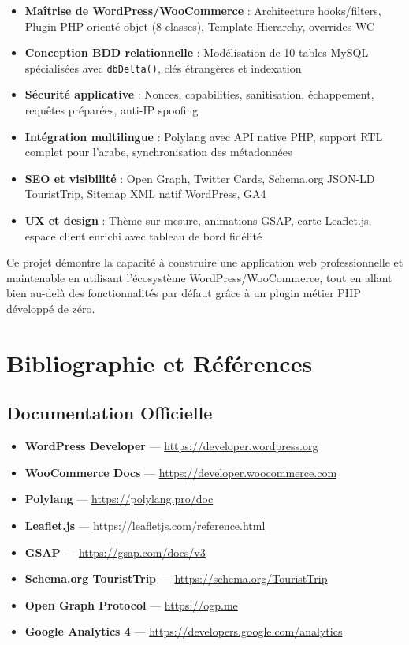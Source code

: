\documentclass[12pt,a4paper]{report}
\begin{document}
\begin{itemize}
  \item \textbf{Ma\^itrise de WordPress/WooCommerce} : Architecture hooks/filters,
        Plugin PHP orient\'e objet (8 classes), Template Hierarchy, overrides WC
  \item \textbf{Conception BDD relationnelle} : Mod\'elisation de 10 tables MySQL
        sp\'ecialis\'ees avec \texttt{dbDelta()}, cl\'es \'etrang\`eres et
        indexation
  \item \textbf{S\'ecurit\'e applicative} : Nonces, capabilities, sanitisation,
        \'echappement, requ\^etes pr\'epar\'ees, anti-IP spoofing
  \item \textbf{Int\'egration multilingue} : Polylang avec API native PHP, support
        RTL complet pour l'arabe, synchronisation des m\'etadonn\'ees
  \item \textbf{SEO et visibilit\'e} : Open Graph, Twitter Cards, Schema.org
        JSON-LD TouristTrip, Sitemap XML natif WordPress, GA4
  \item \textbf{UX et design} : Th\`eme sur mesure, animations GSAP, carte
        Leaflet.js, espace client enrichi avec tableau de bord fid\'elit\'e
\end{itemize}

\bigskip
Ce projet d\'emontre la capacit\'e \`a construire une application web professionnelle
et maintenable en utilisant l'\'ecosyst\`eme WordPress/WooCommerce, tout en
allant bien au-del\`a des fonctionnalit\'es par d\'efaut gr\^ace \`a un plugin
m\'etier PHP d\'evelopp\'e de z\'ero.

\chapter*{Bibliographie et R\'ef\'erences}
\thispagestyle{fancy}

\section*{Documentation Officielle}
\begin{itemize}
  \item \textbf{WordPress Developer} --- \url{https://developer.wordpress.org}
  \item \textbf{WooCommerce Docs} --- \url{https://developer.woocommerce.com}
  \item \textbf{Polylang} --- \url{https://polylang.pro/doc}
  \item \textbf{Leaflet.js} --- \url{https://leafletjs.com/reference.html}
  \item \textbf{GSAP} --- \url{https://gsap.com/docs/v3}
  \item \textbf{Schema.org TouristTrip} --- \url{https://schema.org/TouristTrip}
  \item \textbf{Open Graph Protocol} --- \url{https://ogp.me}
  \item \textbf{Google Analytics 4} --- \url{https://developers.google.com/analytics}
\end{itemize}
\end{document}
